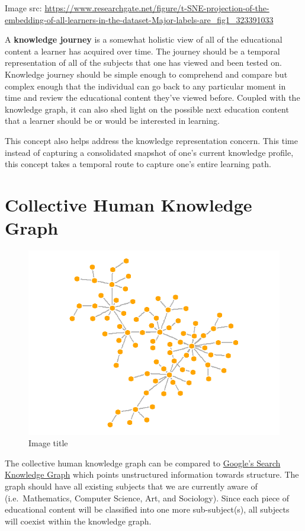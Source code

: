 \documentclass[]{book}
\theoremstyle{definition}
\theoremstyle{definition}
\theoremstyle{definition}
\theoremstyle{remark}
\begin{document}
Image src:
\url{https://www.researchgate.net/figure/t-SNE-projection-of-the-embedding-of-all-learners-in-the-dataset-Major-labels-are_fig1_323391033}

A \textbf{knowledge journey} is a somewhat holistic view of all of the
educational content a learner has acquired over time. The journey should
be a temporal representation of all of the subjects that one has viewed
and been tested on. Knowledge journey should be simple enough to
comprehend and compare but complex enough that the individual can go
back to any particular moment in time and review the educational content
they've viewed before. Coupled with the knowledge graph, it can also
shed light on the possible next education content that a learner should
be or would be interested in learning.

This concept also helps address the knowledge representation concern.
This time instead of capturing a consolidated snapshot of one's current
knowledge profile, this concept takes a temporal route to capture one's
entire learning path.

\section{Collective Human Knowledge
Graph}\label{collective-human-knowledge-graph}

\begin{figure}
\centering
\includegraphics{img/knowledge_graphy.png}
\caption{Image title}
\end{figure}

The collective human knowledge graph can be compared to
\href{@googlekg}{Google's Search Knowledge Graph} which points
unstructured information towards structure. The graph should have all
existing subjects that we are currently aware of (i.e.~Mathematics,
Computer Science, Art, and Sociology). Since each piece of educational
content will be classified into one more sub-subject(s), all subjects
will coexist within the knowledge graph.
\end{document}

